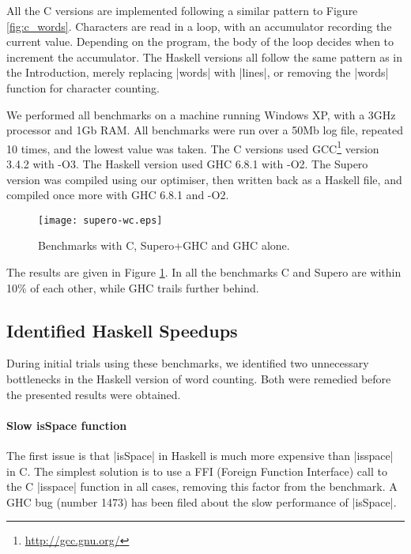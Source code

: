 All the C versions are implemented following a similar pattern to Figure \ref{fig:c_words}. Characters are read in a loop, with an accumulator recording the current value. Depending on the program, the body of the loop decides when to increment the accumulator. The Haskell versions all follow the same pattern as in the Introduction, merely replacing |words| with |lines|, or removing the |words| function for character counting.

We performed all benchmarks on a machine running Windows XP, with a 3GHz processor and 1Gb RAM. All benchmarks were run over a 50Mb log file, repeated 10 times, and the lowest value was taken. The C versions used GCC\footnote{\url{http://gcc.gnu.org/}} version 3.4.2 with -O3. The Haskell version used GHC 6.8.1 with -O2. The Supero version was compiled using our optimiser, then written back as a Haskell file, and compiled once more with GHC 6.8.1 and -O2.

\begin{figure}
\begin{center}
\texttt{[image: supero-wc.eps]}
\end{center}
\caption{Benchmarks with C, Supero+GHC and GHC alone.}
\label{fig:c_results}
\end{figure}

The results are given in Figure \ref{fig:c_results}. In all the benchmarks C and Supero are within 10\% of each other, while GHC trails further behind.

\subsection{Identified Haskell Speedups}

During initial trials using these benchmarks, we identified two unnecessary bottlenecks in the Haskell version of word counting. Both were remedied before the presented results were obtained.

\paragraph{Slow \textsf{isSpace} function}

The first issue is that |isSpace| in Haskell is much more expensive than |isspace| in C. The simplest solution is to use a FFI (Foreign Function Interface) \cite{spj:awkward_squad} call to the C |isspace| function in all cases, removing this factor from the benchmark. A GHC bug (number 1473) has been filed about the slow performance of |isSpace|.

